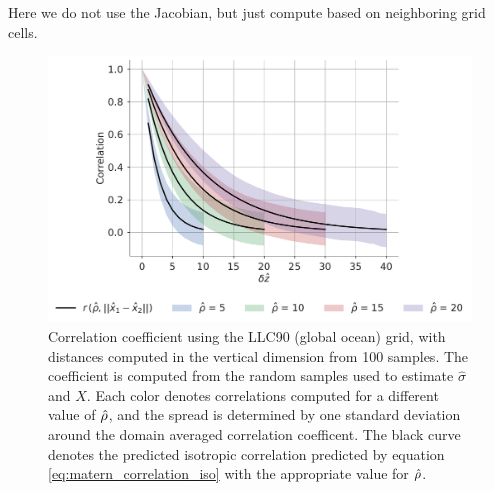 Here we do not use the Jacobian, but just compute based on neighboring grid
cells.
\begin{figure}
    \centering
    \includegraphics[width=\textwidth]{../figures/llc90_nondimensional_correlation_k.pdf}
    \caption{Correlation coefficient using the LLC90 (global ocean) grid, with
        distances computed in the vertical dimension from 100 samples. The coefficient is
        computed from the random samples used to estimate
        $\hat{\sigma}$ and $X$. Each color denotes correlations computed for a
        different value of $\hat{\rho}$, and the spread is determined by one standard
        deviation around the domain averaged correlation coefficent.
        The black curve denotes the predicted isotropic correlation predicted by
        equation \eqref{eq:matern_correlation_iso} with the appropriate value for
        $\hat{\rho}$.}
    \label{fig:llc90_correlations}
\end{figure}

